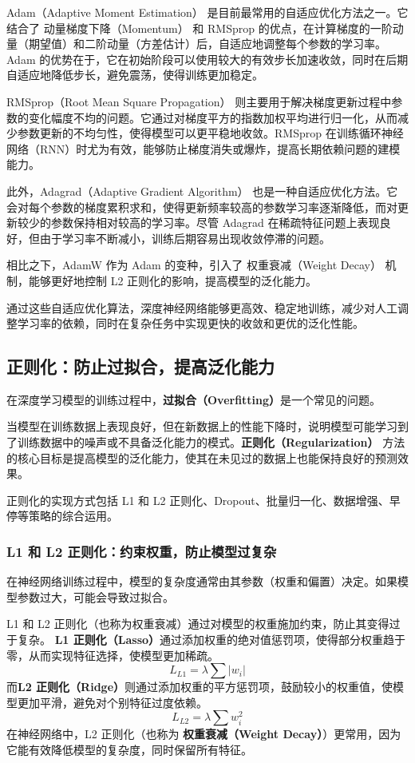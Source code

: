 Adam（Adaptive Moment Estimation） 是目前最常用的自适应优化方法之一。它结合了 动量梯度下降（Momentum） 和 RMSprop 的优点，在计算梯度的一阶动量（期望值）和二阶动量（方差估计）后，自适应地调整每个参数的学习率。Adam 的优势在于，它在初始阶段可以使用较大的有效步长加速收敛，同时在后期自适应地降低步长，避免震荡，使得训练更加稳定。

RMSprop（Root Mean Square Propagation） 则主要用于解决梯度更新过程中参数的变化幅度不均的问题。它通过对梯度平方的指数加权平均进行归一化，从而减少参数更新的不均匀性，使得模型可以更平稳地收敛。RMSprop 在训练循环神经网络（RNN）时尤为有效，能够防止梯度消失或爆炸，提高长期依赖问题的建模能力。

此外，Adagrad（Adaptive Gradient Algorithm） 也是一种自适应优化方法。它会对每个参数的梯度累积求和，使得更新频率较高的参数学习率逐渐降低，而对更新较少的参数保持相对较高的学习率。尽管 Adagrad 在稀疏特征问题上表现良好，但由于学习率不断减小，训练后期容易出现收敛停滞的问题。

相比之下，AdamW 作为 Adam 的变种，引入了 权重衰减（Weight Decay） 机制，能够更好地控制 L2 正则化的影响，提高模型的泛化能力。

通过这些自适应优化算法，深度神经网络能够更高效、稳定地训练，减少对人工调整学习率的依赖，同时在复杂任务中实现更快的收敛和更优的泛化性能。

\subsection{正则化：防止过拟合，提高泛化能力}
在深度学习模型的训练过程中，{\bf 过拟合（Overfitting）}是一个常见的问题。

当模型在训练数据上表现良好，但在新数据上的性能下降时，说明模型可能学习到了训练数据中的噪声或不具备泛化能力的模式。{\bf 正则化（Regularization）} 方法的核心目标是提高模型的泛化能力，使其在未见过的数据上也能保持良好的预测效果。

正则化的实现方式包括 L1 和 L2 正则化、Dropout、批量归一化、数据增强、早停等策略的综合运用。

 \subsubsection*{ L1 和 L2 正则化：约束权重，防止模型过复杂}
在神经网络训练过程中，模型的复杂度通常由其参数（权重和偏置）决定。如果模型参数过大，可能会导致过拟合。

L1 和 L2 正则化（也称为权重衰减）通过对模型的权重施加约束，防止其变得过于复杂。
 {\bf L1 正则化（Lasso）}通过添加权重的绝对值惩罚项，使得部分权重趋于零，从而实现特征选择，使模型更加稀疏。
    \[
  L_{L1} = \lambda \sum |w_i|
  \]
而{\bf L2 正则化（Ridge）}则通过添加权重的平方惩罚项，鼓励较小的权重值，使模型更加平滑，避免对个别特征过度依赖。
  \[
  L_{L2} = \lambda \sum w_i^2
  \]
在神经网络中，L2 正则化（也称为 {\bf 权重衰减（Weight Decay）}）更常用，因为它能有效降低模型的复杂度，同时保留所有特征。

